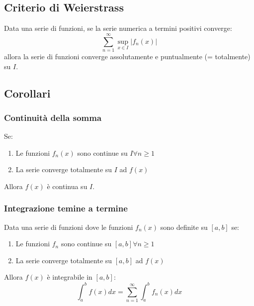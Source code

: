 \documentclass[12pt, a4paper]{article}
\begin{document}
    \subsection{Criterio di Weierstrass}
        Data una serie di funzioni, se la serie numerica a termini positivi converge:
        \begin{equation*}
            \sum_{n=1}^{\infty}\sup_{x\in I}\left|f_n(x)\right|
        \end{equation*}
        allora la serie di funzioni converge assolutamente e puntualmente (= totalmente) su $I$.
    \subsection{Corollari}
        \subsubsection{Continuità della somma}
            Se:
            \begin{enumerate}
                \item Le funzioni $f_n(x)$ sono continue su $I\forall n\geq 1$
                \item La serie converge totalmente su $I$ ad $f(x)$  
            \end{enumerate}
            Allora $f(x)$ è continua su $I$.
        \subsubsection{Integrazione temine a termine}
            Data una serie di funzioni dove le funzioni $f_n(x)$ sono definite su $[a,b]$ se:
            \begin{enumerate}
                \item Le funzioni $f_n$ sono continue su $[a,b]\forall n\geq 1$
                \item La serie converge totalmente su $[a,b]$ ad $f(x)$
            \end{enumerate}
            Allora $f(x)$ è integrabile in $[a,b]$:
            \begin{equation*}
                \int_{a}^{b}f(x)dx = \sum_{n=1}^{\infty}\int_{a}^{b}f_n(x)dx
            \end{equation*}
\end{document}
